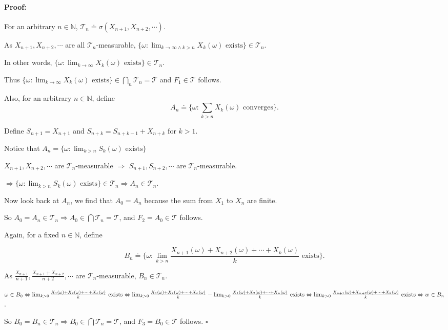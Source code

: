 \documentclass{article}
\newenvironment{myproof}{\ignorespaces\paragraph{Proof:}}{\hfill $\square$\par\noindent}
\begin{document}
	\begin{myproof}
		For an arbitrary $n\in\mathbb{N}$, $\mathcal{T}_n\doteq\sigma(X_{n+1},X_{n+2},\cdots)$.
		
		As $X_{n+1},X_{n+2},\cdots$ are all $\mathcal{T}_n$-measurable, $\{\omega:\lim_{k\rightarrow\infty\wedge k>n} X_k(\omega)\text{ exists}\}\in\mathcal{T}_n$.
		
		In other words, $\{\omega:\lim_{k\rightarrow\infty} X_k(\omega)\text{ exists}\}\in\mathcal{T}_n$.
		
		Thus $\{\omega:\lim_{k\rightarrow\infty} X_k(\omega)\text{ exists}\}\in\bigcap_n\mathcal{T}_n=\mathcal{T}$ and $F_1\in\mathcal{T}$ follows.
		
		Also, for an arbitrary $n\in\mathbb{N}$, define $$A_n\doteq\{\omega:\sum_{k>n}X_k(\omega)\text{ converges}\}.$$
		
		Define $S_{n+1}=X_{n+1}$ and $S_{n+k}=S_{n+k-1}+X_{n+k}\text{ for }k>1$.
		
		Notice that $A_n=\{\omega:\lim_{k>n}S_k(\omega)\text{ exists}\}$
		
		$X_{n+1},X_{n+2},\cdots$ are $\mathcal{T}_n$-measurable $\Rightarrow$ $S_{n+1},S_{n+2},\cdots$ are $\mathcal{T}_n$-measurable.
		
		$\Rightarrow\{\omega:\lim_{k>n}S_k(\omega)\text{ exists}\}\in\mathcal{T}_n\Rightarrow A_n\in\mathcal{T}_n$.
		
		Now look back at $A_n$, we find that $A_0=A_n$ because the sum from $X_1$ to $X_n$ are finite.
		
		So $A_0=A_n\in\mathcal{T}_n\Rightarrow A_0\in\bigcap\mathcal{T}_n=\mathcal{T}$, and $F_2=A_0\in\mathcal{T}$ follows.
		
		Again, for a fixed $n\in\mathbb{N}$, define
		
		$$B_n\doteq\{\omega:\lim_{k>n}\frac{X_{n+1}(\omega)+X_{n+2}(\omega)+\cdots+X_k(\omega)}{k}\text{ exists}\}.$$
		
		As $\frac{X_{n+1}}{n+1},\frac{X_{n+1}+X_{n+2}}{n+2},\cdots$ are $\mathcal{T}_n$-measurable, $B_n\in\mathcal{T}_n$.
		
		$\omega\in B_0\Leftrightarrow\lim_{k>0}\frac{X_1(\omega)+X_2(\omega)+\cdots+X_k(\omega)}{k}\text{ exists}\\\Leftrightarrow\lim_{k>0}\frac{X_1(\omega)+X_2(\omega)+\cdots+X_k(\omega)}{k}-\lim_{k>0}\frac{X_1(\omega)+X_2(\omega)+\cdots+X_n(\omega)}{k}\text{ exists}\\\Leftrightarrow\lim_{k>0}\frac{X_{n+1}(\omega)+X_{n+2}(\omega)+\cdots+X_k(\omega)}{k}\text{ exists}\Leftrightarrow w\in B_n$.
		
		So $B_0=B_n\in\mathcal{T}_n\Rightarrow B_0\in\bigcap\mathcal{T}_n=\mathcal{T}$, and $F_3=B_0\in\mathcal{T}$ follows.
	\end{myproof}
\end{document}
